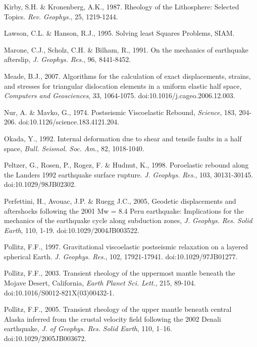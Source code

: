 \documentclass[extra,mreferee]{gji}
\begin{document}
\begin{thebibliography}{}
 Kirby, S.H. \& Kronenberg,
  A.K., 1987. Rheology of the Lithosphere: Selected Topics. \textit{Rev.
  Geophys.}, 25, 1219-1244.

 Lawson, C.L. \&
  Hanson, R.J., 1995. Solving least Squares Problems, SIAM.

 Marone, C.J., Scholz,
  C.H.  \& Bilham, R., 1991. On the mechanics of earthquake
  afterslip, \textit{J. Geophys. Res.}, 96, 8441-8452.

 Meade, B.J., 2007. Algorithms for the
  calculation of exact displacements, strains, and stresses for
  triangular dislocation elements in a uniform elastic half space,
  \textit{Computers and Geosciences}, 33,
  1064-1075. doi:10.1016/j.cageo.2006.12.003.

 Nur, A. \& Mavko, G.,
  1974. Postseismic Viscoelastic Rebound, \textit{Science}, 183,
  204-206. doi:10.1126/science.183.4121.204.

 Okada, Y., 1992. Internal
  deformation due to shear and tensile faults in a half space,
  \textit{Bull. Seismol. Soc.  Am.}, 82, 1018-1040.

 Peltzer, G., Rosen, P.,
  Rogez, F. \& Hudnut, K., 1998. Poroelastic rebound along the Landers
  1992 earthquake surface rupture. \textit{J. Geophys. Res.}, 103,
  30131-30145. doi:10.1029/98JB02302.

 Perfettini, H., Avouac,
  J.P. \& Ruegg J.C., 2005, Geodetic displacements and aftershocks
  following the 2001 Mw = 8.4 Peru earthquake: Implications for the
  mechanics of the earthquake cycle along subduction zones,
  \textit{J. Geophys.  Res. Solid Earth}, 110,
  1-19. doi:10.1029/2004JB003522.

 Pollitz, F.F.,
  1997. Gravitational viscoelastic postseismic relaxation on a layered
  spherical Earth. \textit{J. Geophys. Res.}, 102,
  17921-17941. doi:10.1029/97JB01277.

 Pollitz, F.F., 2003. Transient
  rheology of the uppermost mantle beneath the Mojave Desert,
  California, \textit{Earth Planet Sci. Lett.}, 215,
  89-104. doi:10.1016/S0012-821X(03)00432-1.

Pollitz, F.F., 2005. Transient
  rheology of the upper mantle beneath central Alaska inferred from
  the crustal velocity field following the 2002 Denali earthquake,
  \textit{J. of Geophys. Res. Solid Earth}, 110,
  1–16. doi:10.1029/2005JB003672.


\end{thebibliography}
\end{document}
